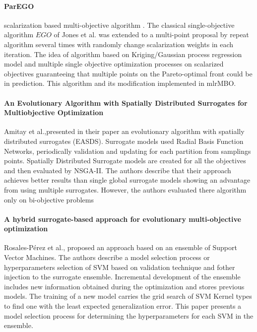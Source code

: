         \paragraph{ParEGO} scalarization based multi-objective algorithm \cite{Knowles06}. The classical single-objective algorithm $EGO$ of Jones et al.  was extended to a multi-point proposal by repeat algorithm several times with randomly change scalarization weights in each iteration. The idea of algorithm based on Kriging/Gaussian process regression model and multiple single objective optimization processes on scalarized objectives guaranteeing that multiple points on the Pareto-optimal front could be in prediction. This algorithm and its modification implemented in mlrMBO\cite{BischlmlrMBO}.


        \paragraph{An Evolutionary Algorithm with Spatially Distributed Surrogates for Multiobjective Optimization} Amitay et al.,\cite{DistrSurr}presented in their paper an evolutionary algorithm with spatially distributed surrogates (EASDS). Surrogate models used Radial Basis Function Networks, periodically validation and updating for each partition from samplings points. Spatially Distributed Surrogate models are created for all the objectives and then evaluated by NSGA-II. The authors describe that their approach achieves better results than single global surrogate models showing an advantage from using multiple surrogates. However, the authors evaluated there algorithm only on bi-objective problems

        \paragraph{A hybrid surrogate-based approach for evolutionary multi-objective optimization} Rosales-Pérez et al.,\cite{HybridSurrRCG} proposed an approach based on an ensemble of Support Vector Machines. The authors describe a model selection process or hyperparameters selection of SVM based on validation technique and fother injection to the surrogate ensemble. Incremental development of the ensemble includes new information obtained during the optimization and stores previous models. The training of a new model carries the grid search of SVM Kernel types to find one with the least expected generalization error. This paper presents a model selection process for determining the hyperparameters for each SVM in the ensemble.

